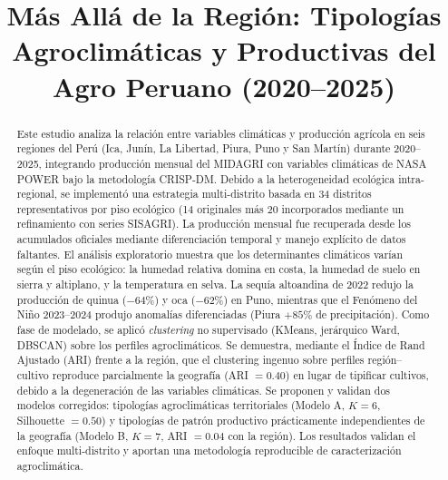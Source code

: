 \documentclass[conference]{IEEEtran}
\begin{document}
\title{Más Allá de la Región: Tipologías Agroclimáticas y Productivas del Agro Peruano (2020--2025)}

\author{
}

\maketitle

\begin{abstract}
Este estudio analiza la relación entre variables climáticas y producción agrícola en seis regiones del Perú (Ica, Junín, La Libertad, Piura, Puno y San Martín) durante 2020--2025, integrando producción mensual del MIDAGRI con variables climáticas de NASA POWER bajo la metodología CRISP-DM. Debido a la heterogeneidad ecológica intra-regional, se implementó una estrategia multi-distrito basada en 34 distritos representativos por piso ecológico (14 originales más 20 incorporados mediante un refinamiento con series SISAGRI). La producción mensual fue recuperada desde los acumulados oficiales mediante diferenciación temporal y manejo explícito de datos faltantes. El análisis exploratorio muestra que los determinantes climáticos varían según el piso ecológico: la humedad relativa domina en costa, la humedad de suelo en sierra y altiplano, y la temperatura en selva. La sequía altoandina de 2022 redujo la producción de quinua ($-64\%$) y oca ($-62\%$) en Puno, mientras que el Fenómeno del Niño 2023--2024 produjo anomalías diferenciadas (Piura $+85\%$ de precipitación). Como fase de modelado, se aplicó \textit{clustering} no supervisado (KMeans, jerárquico Ward, DBSCAN) sobre los perfiles agroclimáticos. Se demuestra, mediante el Índice de Rand Ajustado (ARI) frente a la región, que el clustering ingenuo sobre perfiles región--cultivo reproduce parcialmente la geografía (ARI $=0.40$) en lugar de tipificar cultivos, debido a la degeneración de las variables climáticas. Se proponen y validan dos modelos corregidos: tipologías agroclimáticas territoriales (Modelo A, $K=6$, Silhouette $=0.50$) y tipologías de patrón productivo prácticamente independientes de la geografía (Modelo B, $K=7$, ARI $=0.04$ con la región). Los resultados validan el enfoque multi-distrito y aportan una metodología reproducible de caracterización agroclimática.
\end{abstract}
\end{document}
